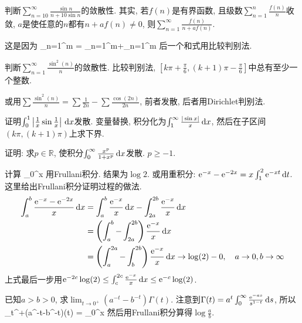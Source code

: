 判断$\sum_{n=10}^{\infty}\frac{\sin n}{n+10\sin n}$的敛散性.
\eq
\ba
其实, 若$f(n)$是有界函数, 且级数$\sum_{n=1}^{n}\frac{f(n)}{n}$收敛, $a$是使任意的$n$都有$n+af(n)\ne 0$, 则$\sum_{n=1}^{\infty}\frac{f(n)}{n+af(n)}$.

这是因为
\bee
\sum_{n=1}^{m}
  = \sum_{n=1}^{m}+\sum_{n=1}^{m}
\eee
后一个和式用比较判别法.
\ea

判断$\sum_{n=1}^{\infty}\frac{\sin^2(n)}{n}$的敛散性.
\eq
\ba
比较判别法, $[k\pi+\frac{\pi}{6}, (k+1)\pi-\frac{\pi}{6}]$中总有至少一个整数.

或用$\sum\frac{\sin^2(n)}{n}=\sum\frac{1}{2n}-\sum\frac{\cos(2n)}{2n}$, 前者发散, 后者用Dirichlet判别法.
\ea

证明$\int_0^1\left|\frac{1}{x}\sin\frac{1}{x}\right|\,\mathrm{d} x$发散.
\eq
\ba
变量替换, 积分化为$\int_1^{\infty}\frac{|\sin x|}{x}\,\mathrm{d} x$, 然后在子区间$(k\pi, (k+1)\pi)$上求下界. 
\ea

证明: 求$p\in\mathbb{R}$, 使积分$\int_0^{\infty}\frac{x^p}{1+x^p}\,\mathrm{d} x$发散.
\eq
\ba
$p\ge-1$.
\ea

计算
\bee
\int_0^{\infty}\ud x
\eee
\eq
\ba
用Frullani积分. 结果为$\log 2$. 或用重积分: $\mathrm{e}^{-x}-\mathrm{e}^{-2x}=x\int_1^2\mathrm{e}^{-xt}\,\mathrm{d} t$. 这里给出Frullani积分证明过程的做法.
\begin{align*}
 \int_a^b\frac{\mathrm{e}^{-x}-\mathrm{e}^{-2x}}{x}\,\mathrm{d} x
  & =\int_a^b\frac{\mathrm{e}^{-x}}{x}\,\mathrm{d} x - \int_{2a}^{2b}\frac{\mathrm{e}^{-x}}{x}\,\mathrm{d} x\\
  & =\left(\int_a^b-\int_{2a}^{2b}\right)\frac{\mathrm{e}^{-x}}{x}\,\mathrm{d} x\\
  & = \left(\int_a^{2a}-\int_{b}^{2b}\right)\frac{\mathrm{e}^{-x}}{x}\,\mathrm{d} x\to\log(2)-0, \quad a\to0, b\to\infty
\end{align*}
上式最后一步用$\mathrm{e}^{-2c}\log(2)\le\int_c^{2c}\frac{\mathrm{e}^{-x}}{x}\,\mathrm{d} x\le\mathrm{e}^{-c}\log(2)$.
\ea

已知$a>b>0$, 求$\lim_{t\to0^+}(a^{-t}-b^{-t})\Gamma(t)$.
\eq
\ba
注意到$\Gamma(t)=a^t\int_0^{\infty}\frac{\mathrm{e}^{-as}}{s^{1-t}}\,\mathrm{d} s$, 所以
\bee
\lim_{t^+}(a^{-t}-b^{-t})\Gamma(t)
  = \int_0^{\infty}\ud x
\eee
然后用Frullani积分算得$\log\frac{a}{b}$.
\ea

